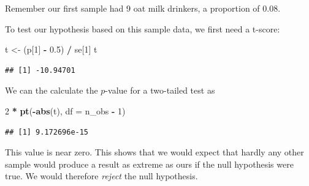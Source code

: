 \documentclass[
  11pt,
]{article}
\newenvironment{Shaded}{\begin{snugshade}}{\end{snugshade}}
\newcommand{\AttributeTok}[1]{\textcolor[rgb]{0.13,0.29,0.53}{#1}}
\newcommand{\DecValTok}[1]{\textcolor[rgb]{0.00,0.00,0.81}{#1}}
\newcommand{\FloatTok}[1]{\textcolor[rgb]{0.00,0.00,0.81}{#1}}
\newcommand{\FunctionTok}[1]{\textcolor[rgb]{0.13,0.29,0.53}{\textbf{#1}}}
\newcommand{\NormalTok}[1]{#1}
\newcommand{\OtherTok}[1]{\textcolor[rgb]{0.56,0.35,0.01}{#1}}
\newcommand{\SpecialCharTok}[1]{\textcolor[rgb]{0.81,0.36,0.00}{\textbf{#1}}}
\begin{document}
Remember our first sample had 9 oat milk drinkers, a proportion of 0.08.

To test our hypothesis based on this sample data, we first need a t-score:

\begin{Shaded}
\begin{Highlighting}[]
\NormalTok{t }\OtherTok{\textless{}{-}}\NormalTok{ (p[}\DecValTok{1}\NormalTok{] }\SpecialCharTok{{-}} \FloatTok{0.5}\NormalTok{) }\SpecialCharTok{/}\NormalTok{ se[}\DecValTok{1}\NormalTok{]}
\NormalTok{t}
\end{Highlighting}
\end{Shaded}

\begin{verbatim}
## [1] -10.94701
\end{verbatim}

We can the calculate the \(p\)-value for a two-tailed test as

\begin{Shaded}
\begin{Highlighting}[]
\DecValTok{2} \SpecialCharTok{*} \FunctionTok{pt}\NormalTok{(}\SpecialCharTok{{-}}\FunctionTok{abs}\NormalTok{(t), }\AttributeTok{df =}\NormalTok{ n\_obs }\SpecialCharTok{{-}} \DecValTok{1}\NormalTok{)}
\end{Highlighting}
\end{Shaded}

\begin{verbatim}
## [1] 9.172696e-15
\end{verbatim}

This value is near zero. This shows that we would expect that hardly any other sample would produce a result as extreme as ours if the null hypothesis were true. We would therefore \emph{reject} the null hypothesis.
\end{document}
